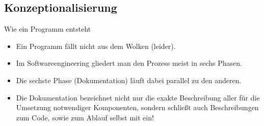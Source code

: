 \subsection{Konzeptionalisierung}
\begin{frame}{Wie ein Programm entsteht}
    \begin{itemize}[<+(1)->]
        \widei
        \item Ein Programm fällt nicht aus dem Wolken (leider).
        \item Im Softwareengineering gliedert man den Prozess meist in sechs Phasen.
        \item Die sechste Phase (Dokumentation) läuft dabei parallel zu den anderen.
        \item Die Dokumentation bezeichnet nicht nur die exakte Beschreibung aller für die Umsetzung notwendiger Komponenten,\pause{} sondern schließt auch Beschreibungen zum Code,\pause{} sowie zum Ablauf selbst mit ein!
    \end{itemize}
\end{frame}

